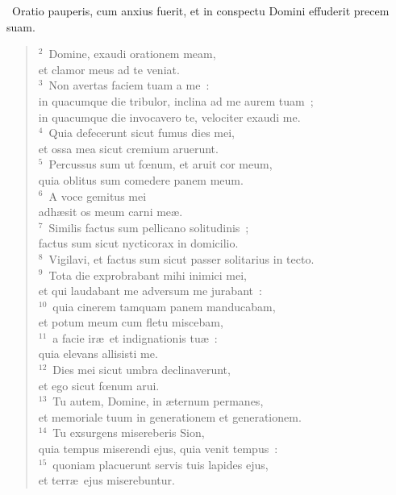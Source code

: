 ~\lettrine[lines=10,image=true,loversize=0.05,lraise=-0.03]{O}{}ratio pauperis, cum anxius fuerit, et in conspectu Domini effuderit precem suam.
\begin{flushleft}\begin{verse}\vspace{6pt}${}^{2}$~Domine, exaudi orationem meam,\\ et clamor meus ad te veniat.\\
${}^{3}$~Non avertas faciem tuam a me~:\\ in quacumque die tribulor, inclina ad me aurem tuam~;\\ in quacumque die invocavero te, velociter exaudi me.\\
${}^{4}$~Quia defecerunt sicut fumus dies mei,\\ et ossa mea sicut cremium aruerunt.\\
${}^{5}$~Percussus sum ut fœnum, et aruit cor meum,\\ quia oblitus sum comedere panem meum.\\
${}^{6}$~A voce gemitus mei\\ adh\ae sit os meum carni me\ae .\\
${}^{7}$~Similis factus sum pellicano solitudinis~;\\ factus sum sicut nycticorax in domicilio.\\
${}^{8}$~Vigilavi, et factus sum sicut passer solitarius in tecto.\\
${}^{9}$~Tota die exprobrabant mihi inimici mei,\\ et qui laudabant me adversum me jurabant~:\\
${}^{10}$~quia cinerem tamquam panem manducabam,\\ et potum meum cum fletu miscebam,\\
${}^{11}$~a facie ir\ae\ et indignationis tu\ae~:\\ quia elevans allisisti me.\\
${}^{12}$~Dies mei sicut umbra declinaverunt,\\ et ego sicut fœnum arui.\\
${}^{13}$~Tu autem, Domine, in \ae ternum permanes,\\ et memoriale tuum in generationem et generationem.\\
${}^{14}$~Tu exsurgens misereberis Sion,\\ quia tempus miserendi ejus, quia venit tempus~:\\
${}^{15}$~quoniam placuerunt servis tuis lapides ejus,\\ et terr\ae\ ejus miserebuntur.\\

\end{verse}
\end{flushleft}
